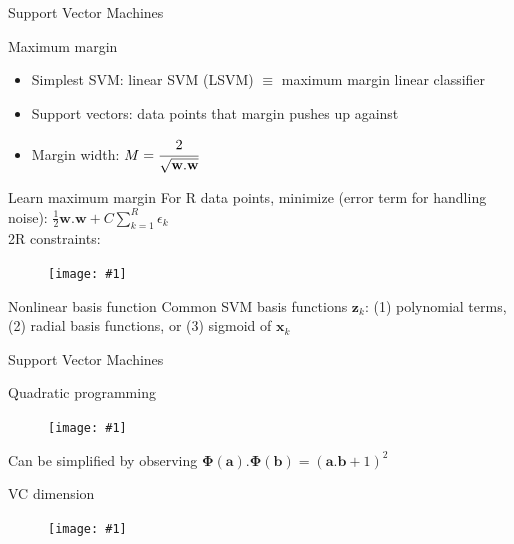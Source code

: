 \documentclass[9pt,t]{beamer}
\newcommand{\picEqHereWidth}[2] { %
    \begin{figure}[htp] 
        \centering
        \texttt{[image: \#1]}
    \end{figure}
}
\begin{document}
\begin{frame}{Support Vector Machines}
    \begin{alertblock}{Maximum margin}
        \begin{itemize}
            \item Simplest SVM: linear SVM (LSVM) $ \equiv $ maximum margin linear classifier
            \item Support vectors: data points that margin pushes up against
            \item Margin width: $ M = \cfrac{2}{\sqrt{\mathbf{w} . \mathbf{w}}} $
        \end{itemize}
    \end{alertblock}
    \begin{alertblock}{Learn maximum margin}
        For R data points, minimize (error term for handling noise): $ \frac{1}{2} \mathbf{w} . \mathbf{w} + C \sum_{k=1}^{R}\epsilon_k $ \\
        2R constraints:
        \picEqHereWidth{svm_constraints}{0.3\linewidth}
    \end{alertblock}
    \begin{alertblock}{Nonlinear basis function}
        Common SVM basis functions $ \mathbf{z}_k $: (1) polynomial terms, (2) radial basis functions, or (3) sigmoid of $ \mathbf{x}_k $
    \end{alertblock}
\end{frame}

\begin{frame}{Support Vector Machines}
    \begin{alertblock}{Quadratic programming}
        \picEqHereWidth{svm_qp}{\linewidth}
        Can be simplified by observing $ \mathbf{\Phi(a) . \Phi(b)} = (\mathbf{a . b} +1)^2 $
    \end{alertblock}
    \begin{alertblock}{VC dimension}
        \picEqHereWidth{svm_vcdim}{0.4\linewidth}
    \end{alertblock}
\end{frame}
\end{document}
